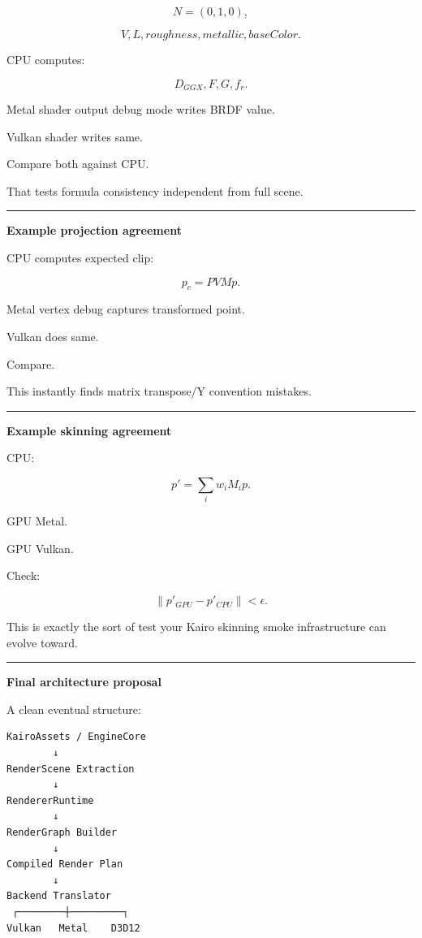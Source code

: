 \[
N=(0,1,0),
\]

\[
V,
L,
roughness,
metallic,
baseColor.
\]

CPU computes:

\[
D_{GGX},
F,
G,
f_r.
\]

Metal shader output debug mode writes BRDF value.

Vulkan shader writes same.

Compare both against CPU.

That tests formula consistency independent from full scene.

\begin{center}\rule{0.5\linewidth}{0.5pt}\end{center}

\textbf{Example projection agreement}

CPU computes expected clip:

\[
p_c=PVMp.
\]

Metal vertex debug captures transformed point.

Vulkan does same.

Compare.

This instantly finds matrix transpose/Y convention mistakes.

\begin{center}\rule{0.5\linewidth}{0.5pt}\end{center}

\textbf{Example skinning agreement}

CPU:

\[
p'=
\sum_i
w_i
M_i p.
\]

GPU Metal.

GPU Vulkan.

Check:

\[
\|p'_{GPU}-p'_{CPU}\|
<
\epsilon.
\]

This is exactly the sort of test your Kairo skinning smoke infrastructure can evolve toward.

\begin{center}\rule{0.5\linewidth}{0.5pt}\end{center}

\textbf{Final architecture proposal}

A clean eventual structure:

\begin{verbatim}
KairoAssets / EngineCore
        ↓
RenderScene Extraction
        ↓
RendererRuntime
        ↓
RenderGraph Builder
        ↓
Compiled Render Plan
        ↓
Backend Translator
 ┌────────┼─────────┐
Vulkan   Metal    D3D12
\end{verbatim}

